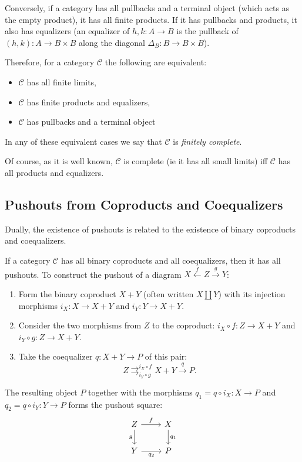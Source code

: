 \documentclass[11pt]{article}
\theoremstyle{definition}
\begin{document}
Conversely, if a category has all pullbacks and a terminal object (which acts as the empty product), it has all finite products. If it has pullbacks and products, it also has equalizers (an equalizer of $h, k: A \to B$ is the pullback of $(h, k): A \to B \times B$ along the diagonal $\Delta_B: B \to B \times B$).

Therefore, for a category $\mathcal{C}$ the following are equivalent:
\begin{itemize}
    \item $\mathcal{C}$ has all finite limits,
    \item $\mathcal{C}$ has finite products and equalizers,
    \item $\mathcal{C}$ has pullbacks and a terminal object
\end{itemize}
In any of these equivalent cases we say that $\mathcal{C}$ is \textit{finitely complete}.

Of course, as it is well known, $\mathcal{C}$ is complete (ie it has all small limits) iff $\mathcal{C}$  has all products and equalizers.



\subsection{Pushouts from Coproducts and Coequalizers}
Dually, the existence of pushouts is related to the existence of binary coproducts and coequalizers.

If a category $\mathcal{C}$ has all binary coproducts and all coequalizers, then it has all pushouts. To construct the pushout of a diagram $X \xleftarrow{f} Z \xrightarrow{g} Y$:
\begin{enumerate}
    \item Form the binary coproduct $X + Y$ (often written $X \amalg Y$) with its injection morphisms $i_X: X \to X + Y$ and $i_Y: Y \to X + Y$.
    \item Consider the two morphisms from $Z$ to the coproduct: $i_X \circ f : Z \to X + Y$ and $i_Y \circ g : Z \to X + Y$.
    \item Take the coequalizer $q: X + Y \to P$ of this pair:
    \[
    Z \rightrightarrows^{i_X \circ f}_{i_Y \circ g} X + Y \xrightarrow{q} P.
    \]
\end{enumerate}
The resulting object $P$ together with the morphisms $q_1 = q \circ i_X : X \to P$ and $q_2 = q \circ i_Y : Y \to P$ forms the pushout square:
\[
\begin{tikzcd}
Z \arrow[r, "f"] \arrow[d, "g"'] & X \arrow[d, "q_1"] \\
Y \arrow[r, "q_2"'] & P
\end{tikzcd}
\]
\end{document}
